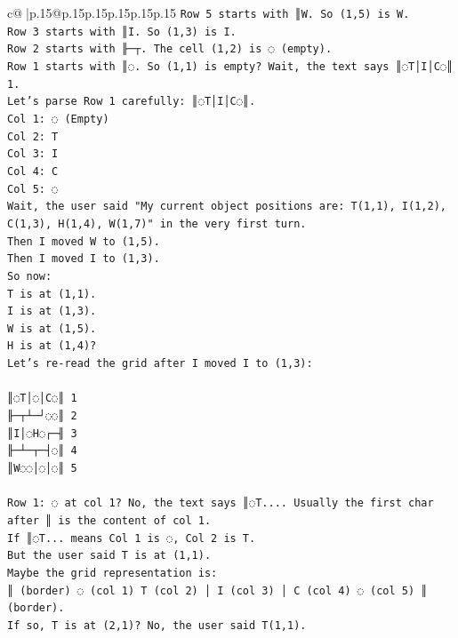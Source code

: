 \documentclass{article}
\begin{document}
{\begin{supertabular}{c@{$\;$}|p{.15\linewidth}@{}p{.15\linewidth}p{.15\linewidth}p{.15\linewidth}p{.15\linewidth}p{.15\linewidth}}
{{{\texttt{Row 5 starts with ║W. So (1,5) is W.} \\
\texttt{Row 3 starts with ║I. So (1,3) is I.} \\
\texttt{Row 2 starts with ╟─┬. The cell (1,2) is ◌ (empty).} \\
\texttt{Row 1 starts with ║◌. So (1,1) is empty? Wait, the text says ║◌T│I│C◌║ 1.} \\
\texttt{Let's parse Row 1 carefully: ║◌T│I│C◌║.} \\
\texttt{Col 1: ◌ (Empty)} \\
\texttt{Col 2: T} \\
\texttt{Col 3: I} \\
\texttt{Col 4: C} \\
\texttt{Col 5: ◌} \\
\texttt{Wait, the user said "My current object positions are: T(1,1), I(1,2), C(1,3), H(1,4), W(1,7)" in the very first turn.} \\
\texttt{Then I moved W to (1,5).} \\
\texttt{Then I moved I to (1,3).} \\
\texttt{So now:} \\
\texttt{T is at (1,1).} \\
\texttt{I is at (1,3).} \\
\texttt{W is at (1,5).} \\
\texttt{H is at (1,4)?} \\
\texttt{Let's re{-}read the grid after I moved I to (1,3):} \\
\\ 
\texttt{║◌T│◌│C◌║ 1} \\
\texttt{╟─┬┴─┘◌◌║ 2} \\
\texttt{║I│◌H◌┌─╢ 3} \\
\texttt{╟─┴─┬─┤◌║ 4} \\
\texttt{║W◌◌│◌│◌║ 5} \\
\\ 
\texttt{Row 1: ◌ at col 1? No, the text says ║◌T.... Usually the first char after ║ is the content of col 1.} \\
\texttt{If ║◌T... means Col 1 is ◌, Col 2 is T.} \\
\texttt{But the user said T is at (1,1).} \\
\texttt{Maybe the grid representation is:} \\
\texttt{║ (border) ◌ (col 1) T (col 2) │ I (col 3) │ C (col 4) ◌ (col 5) ║ (border).} \\
\texttt{If so, T is at (2,1)? No, the user said T(1,1).} \\
}}}
\end{supertabular}}
\end{document}
